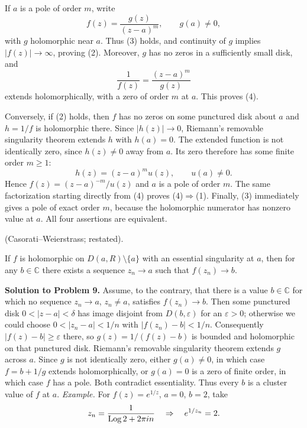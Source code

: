 \begin{solution}
If $a$ is a pole of order $m$, write
\[
f(z)=\frac{g(z)}{(z-a)^m},\qquad g(a)\ne0,
\]
with $g$ holomorphic near $a$. Thus (3) holds, and continuity of $g$
implies $|f(z)|\to\infty$, proving (2). Moreover, $g$ has no zeros
in a sufficiently small disk, and
\[
\frac1{f(z)}=\frac{(z-a)^m}{g(z)}
\]
extends holomorphically, with a zero of order $m$ at $a$. This proves (4).

Conversely, if (2) holds, then $f$ has no zeros on some punctured disk
about $a$ and $h=1/f$ is holomorphic there. Since $|h(z)|\to0$,
Riemann's removable singularity theorem extends $h$ with $h(a)=0$.
The extended function is not identically zero, since $h(z)\ne0$ away
from $a$. Its zero therefore has some finite order $m\ge1$:
\[
h(z)=(z-a)^m u(z),\qquad u(a)\ne0.
\]
Hence $f(z)=(z-a)^{-m}/u(z)$ and $a$ is a pole of order $m$.
The same factorization starting directly from (4) proves (4)$\Rightarrow$(1).
Finally, (3) immediately gives a pole of exact order $m$, because the
holomorphic numerator has nonzero value at $a$. All four assertions
are equivalent.
\end{solution}


\begin{problem}[CP-IV-0133]
\label{prob:cp-iv-0133}
(Casorati--Weierstrass; restated).

If $f$ is holomorphic on $D(a,R)\setminus\{a\}$ with an essential singularity at $a$, then for any $b\in\mathbb C$
there exists a sequence $z_n\to a$ such that $f(z_n)\to b$.

\medskip
\end{problem}

\begin{solution}
\par\medskip\noindent\textbf{Solution to Problem 9.}\quad 
Assume, to the contrary, that there is a value $b\in\mathbb C$ for
which no sequence $z_n\to a$, $z_n\ne a$, satisfies $f(z_n)\to b$.
Then some punctured disk $0<|z-a|<\delta$ has image disjoint from
$D(b,\varepsilon)$ for an $\varepsilon>0$; otherwise we could choose
$0<|z_n-a|<1/n$ with $|f(z_n)-b|<1/n$.
Consequently $|f(z)-b|\ge\varepsilon$ there, so
$g(z)=1/(f(z)-b)$ is bounded and holomorphic on that punctured disk.
Riemann's removable singularity theorem extends $g$ across $a$.
Since $g$ is not identically zero, either $g(a)\ne0$, in which case
$f=b+1/g$ extends holomorphically, or $g(a)=0$ is a zero of finite
order, in which case $f$ has a pole. Both contradict essentiality.
Thus every $b$ is a cluster value of $f$ at $a$.
\emph{Example.} For $f(z)=e^{1/z}$, $a=0$, $b=2$, take
\[
z_n=\frac{1}{\operatorname{Log} 2+2\pi i n}\quad\Rightarrow\quad e^{1/z_n}=2 .
\]

\bigskip
\end{solution}


